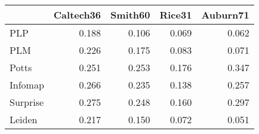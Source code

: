 \begin{tabular}{lrrrr}
\toprule
{} & Caltech36 & Smith60 & Rice31 & Auburn71 \\
\midrule
PLP      &     0.188 &   0.106 &  0.069 &    0.062 \\
PLM      &     0.226 &   0.175 &  0.083 &    0.071 \\
Potts    &     0.251 &   0.253 &  0.176 &    0.347 \\
Infomap  &     0.266 &   0.235 &  0.138 &    0.257 \\
Surprise &     0.275 &   0.248 &  0.160 &    0.297 \\
Leiden   &     0.217 &   0.150 &  0.072 &    0.051 \\
\bottomrule
\end{tabular}
